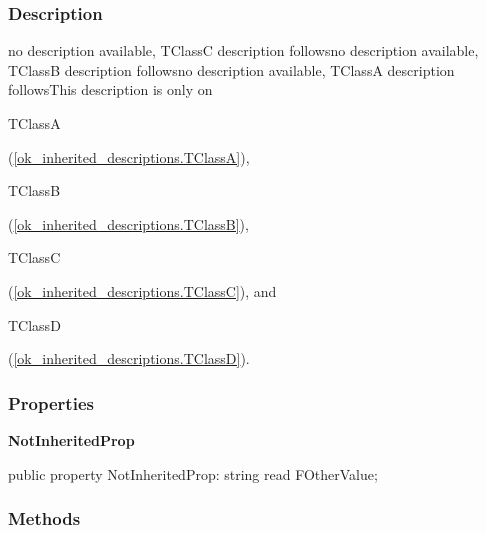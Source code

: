 \documentclass{report}
\newif\ifpdf
\begin{document}
\subsubsection*{\large{\textbf{Description}}\normalsize\hspace{1ex}\hfill}
no description available, TClassC description followsno description available, TClassB description followsno description available, TClassA description followsThis description is only on \begin{ttfamily}TClassA\end{ttfamily}(\ref{ok_inherited_descriptions.TClassA}), \begin{ttfamily}TClassB\end{ttfamily}(\ref{ok_inherited_descriptions.TClassB}), \begin{ttfamily}TClassC\end{ttfamily}(\ref{ok_inherited_descriptions.TClassC}), and \begin{ttfamily}TClassD\end{ttfamily}(\ref{ok_inherited_descriptions.TClassD}).\subsubsection*{\large{\textbf{Properties}}\normalsize\hspace{1ex}\hfill}
\begin{list}{}{
\setlength{\itemindent}{0cm}
\setlength{\listparindent}{0cm}
\setlength{\leftmargin}{\evensidemargin}
\addtolength{\leftmargin}{\tmplength}
\settowidth{\labelsep}{X}
\addtolength{\leftmargin}{\labelsep}
\setlength{\labelwidth}{\tmplength}
}
\label{ok_inherited_descriptions.TClassD-NotInheritedProp}
\item[\textbf{NotInheritedProp}\hfill]
\ifpdf
\begin{flushleft}
\fi
\begin{ttfamily}
public property NotInheritedProp: string read FOtherValue;\end{ttfamily}

\ifpdf
\end{flushleft}
\fi


\par  \end{list}
\subsubsection*{\large{\textbf{Methods}}\normalsize\hspace{1ex}\hfill}
\end{document}
